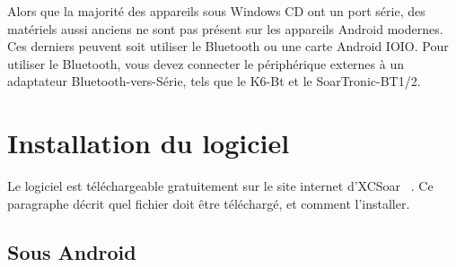\newcommand{\y}[0]{{ $\surd$ }}
\noindent{}

Alors que la majorité des appareils sous Windows CD ont un port série, des matériels
aussi anciens ne sont pas présent sur les appareils Android modernes. Ces derniers peuvent soit
utiliser le Bluetooth ou une carte Android IOIO. Pour utiliser le Bluetooth, vous devez
connecter le périphérique externes à un adaptateur Bluetooth-vers-Série, tels
que le K6-Bt et le SoarTronic-BT1/2.

\section{Installation du logiciel}

Le logiciel est téléchargeable gratuitement sur le site internet d'XCSoar ~\xcsoarwebsite{}. Ce paragraphe décrit quel fichier doit être téléchargé, et comment l'installer.

\subsection*{Sous Android}

